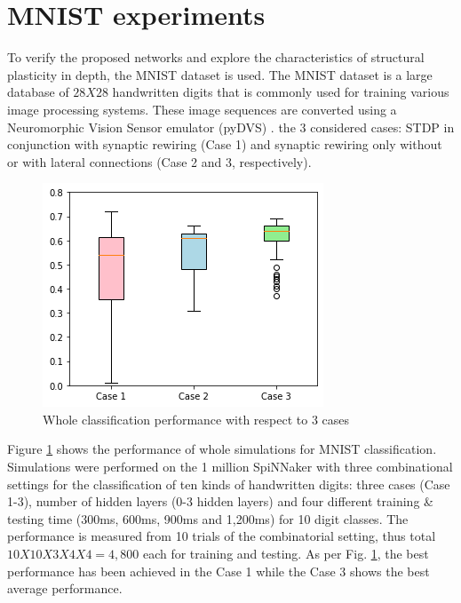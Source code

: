 \documentclass[letterpaper, 10 pt, conference]{ieeeconf}  %
\begin{document}


\section{MNIST experiments}

To verify the proposed networks and explore the characteristics of structural plasticity in depth, the MNIST dataset is used. 
The MNIST dataset is a large database of $28 X 28$ handwritten digits that is commonly used for training various image processing systems. 
These image sequences are converted using a Neuromorphic Vision Sensor emulator (pyDVS) \cite{garcia2016pydvs}.
the 3 considered cases: STDP in conjunction with synaptic rewiring (Case 1) and synaptic rewiring only without or with lateral connections (Case 2 and 3, respectively).

\begin{figure}[tbh]
    \centering
    \includegraphics[width=0.80\linewidth, trim=0cm 0cm 0cm 0cm, clip=true]{10trials/boxPlotCase}
    \caption{Whole classification performance with respect to 3 cases}
    \label{fig:bpWCases}
\end{figure}

Figure \ref{fig:bpWCases} shows the performance of whole simulations for MNIST classification.
Simulations were performed on the 1 million SpiNNaker \cite{brown2018spinnaker} with three combinational settings for the classification of ten kinds of handwritten digits: three cases (Case 1-3), number of hidden layers (0-3 hidden layers) and four different training \& testing time (300ms, 600ms, 900ms and 1,200ms) for 10 digit classes. The performance is measured from 10 trials of the combinatorial setting, thus total $10 X 10 X 3 X 4 X 4 = 4,800$ each for training and testing. As per Fig. \ref{fig:bpWCases}, the best performance has been achieved in the Case 1 while the Case 3 shows the best average performance.
\end{document}
